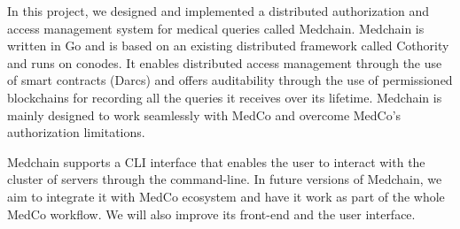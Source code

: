 In this project, we designed and implemented a distributed authorization and access management system for medical queries called Medchain. Medchain is written in Go and is based on an existing distributed framework called Cothority and runs on conodes. It enables distributed access management through the use of smart contracts (Darcs) and offers auditability through the use of permissioned blockchains for recording all the queries it receives over its lifetime. Medchain is mainly designed to work seamlessly with MedCo and overcome MedCo's authorization limitations.

Medchain supports a CLI interface that enables the user to interact with the cluster of servers through the command-line. In future versions of Medchain, we aim to integrate it with MedCo ecosystem and have it work as part of the whole MedCo workflow. We will also improve its front-end and the user interface.    